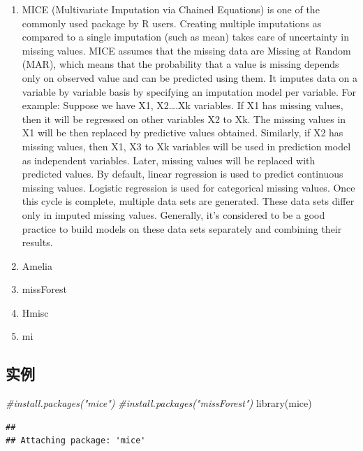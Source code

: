 \documentclass[
]{book}
\newenvironment{Shaded}{\begin{snugshade}}{\end{snugshade}}
\newcommand{\CommentTok}[1]{\textcolor[rgb]{0.56,0.35,0.01}{\textit{#1}}}
\newcommand{\FunctionTok}[1]{\textcolor[rgb]{0.00,0.00,0.00}{#1}}
\newcommand{\NormalTok}[1]{#1}
\providecommand{\tightlist}{%
  \setlength{\itemsep}{0pt}\setlength{\parskip}{0pt}}
\begin{document}
\begin{enumerate}
\def\labelenumi{\arabic{enumi}.}
\tightlist
\item
  MICE
  (Multivariate Imputation via Chained Equations) is one of the commonly used package by R users. Creating multiple imputations as compared to a single imputation (such as mean) takes care of uncertainty in missing values.
  MICE assumes that the missing data are Missing at Random (MAR), which means that the probability that a value is missing depends only on observed value and can be predicted using them. It imputes data on a variable by variable basis by specifying an imputation model per variable.
  For example: Suppose we have X1, X2\ldots.Xk variables. If X1 has missing values, then it will be regressed on other variables X2 to Xk. The missing values in X1 will be then replaced by predictive values obtained. Similarly, if X2 has missing values, then X1, X3 to Xk variables will be used in prediction model as independent variables. Later, missing values will be replaced with predicted values.
  By default, linear regression is used to predict continuous missing values. Logistic regression is used for categorical missing values. Once this cycle is complete, multiple data sets are generated. These data sets differ only in imputed missing values. Generally, it's considered to be a good practice to build models on these data sets separately and combining their results.
\item
  Amelia
\item
  missForest
\item
  Hmisc
\item
  mi
\end{enumerate}

\hypertarget{ux5b9eux4f8b}{%
\subsection{实例}\label{ux5b9eux4f8b}}

\begin{Shaded}
\begin{Highlighting}[]
\CommentTok{\#install.packages("mice")}
\CommentTok{\#install.packages("missForest")}
\FunctionTok{library}\NormalTok{(mice)}
\end{Highlighting}
\end{Shaded}

\begin{verbatim}
## 
## Attaching package: 'mice'
\end{verbatim}
\end{document}
